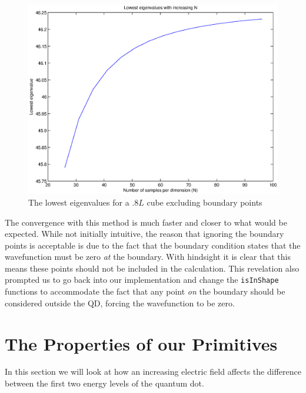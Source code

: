 \documentclass[authoryearcitations]{UoYCSproject}
\begin{document}
\begin{figure}[!h]
\centering
\includegraphics[scale=0.4]{figures/M2converge.eps}
\caption{The lowest eigenvalues for a $.8L$ cube excluding boundary points} 
\label{M2convergePlot}
\end{figure}

The convergence with this method is much faster and closer to what would be expected. While not initially intuitive, the reason
that ignoring the boundary points is acceptable is due to the fact that the boundary condition states that the wavefunction
must be zero \emph{at} the boundary. With hindsight it is clear that this means these points should not be included in the 
calculation. This revelation also prompted us to go back into our implementation and change the \verb+isInShape+ functions to 
accommodate the fact that any point \emph{on} the boundary should be considered outside the QD, forcing the wavefunction to be
zero.  


\section{The Properties of our Primitives}
In this section we will look at how an increasing electric field affects the difference between the first two energy levels of
the quantum dot. 
\end{document}
